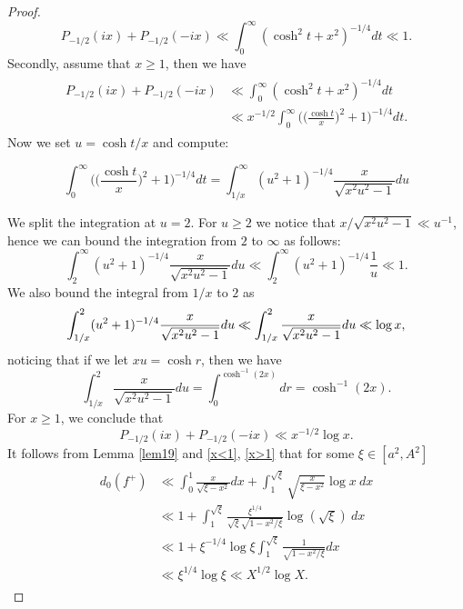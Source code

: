 \documentclass[a4paper,11pt]{amsart}
\theoremstyle{definition}
\begin{document}
\begin{proof}
\begin{equation}\label{x<1}P_{-1/2}(ix)+P_{-1/2}(-ix) \ll \int_0^{\infty}(\cosh^2t+x^2)^{-1/4}dt\ll 1.
\end{equation}
Secondly, assume that $x\ge 1$, then we have
\begin{align}
        \begin{split}
            P_{-1/2}(ix)+P_{-1/2}(-ix) &\ll \int_0^{\infty}(\cosh^2t+x^2)^{-1/4}dt \\
            & \ll x^{-1/2}\int_0^{\infty}\Big(\Big(\frac{\cosh t}{x}\Big)^2+1\Big)^{-1/4}dt.
        \end{split}
\end{align}
Now we set $u=\cosh t\big/x$ and compute:

          $$  \int_0^{\infty}\Big(\Big(\frac{\cosh t}{x}\Big)^2+1\Big)^{-1/4}dt = \int_{1/x}^{\infty}(u^2+1)^{-1/4}\frac{x}{\sqrt{x^2u^2-1}}du $$
         
We split the integration at $u=2$. For 
 $u\ge 2$ we notice that 
    $x\big/\sqrt{x^2u^2-1} \ll u^{-1}$,
    hence we can bound the integration from $2$ to $\infty$ as follows: 
    $$\int_{2}^{\infty}(u^2+1)^{-1/4}\frac{x}{\sqrt{x^2u^2-1}}du \ll \int_{2}^{\infty}(u^2+1)^{-1/4}\frac{1}{u}\ll 1.$$
    We also bound the integral from $1/x$ to $2$ as
    \begin{align}\notag
        \begin{split}
            \int_{1/x}^{2}(u^2+1)^{-1/4}\frac{x}{\sqrt{x^2u^2-1}}du \ll \int_{1/x}^2\frac{x}{\sqrt{x^2u^2-1}}du \ll \log x,
        \end{split}
    \end{align}
    noticing that if we let $xu=\cosh r$, then we have 
    $$\int_{1/x}^2\frac{x}{\sqrt{x^2u^2-1}}du =\int_{0}^{\cosh^{-1}(2x)} dr = \cosh^{-1}(2x).$$
    For $x\ge 1$, we conclude that 
    \begin{equation}\label{x>1}
         P_{-1/2}(ix)+P_{-1/2}(-ix) \ll x^{-1/2}\log x.
    \end{equation}
    It follows from Lemma \ref{lem19} and \eqref{x<1}, \eqref{x>1} that for some $\xi \in [a^2,A^2]$
\begin{align}
        \begin{split}
            d_0(f^{+}) &\ll 
             \int_0^{1}\frac{x}{\sqrt{\xi-x^2}}dx + \int_1^{\sqrt{\xi}}\sqrt{\frac{x}{\xi-x^2}}\log x\:dx \\
            &\ll 1+\int_1^{\sqrt{\xi}}\frac{\xi^{1/4}}{\sqrt{\xi}\sqrt{1-x^2/\xi}}\log( \sqrt{\xi})\:dx \\
             &\ll 1+\xi^{-1/4}\log \xi \int_1^{\sqrt{\xi}}\frac{1}{\sqrt{1-x^2/\xi}}dx \\
            &\ll \xi^{1/4}\log \xi \ll X^{1/2}\log X.
        \end{split}
    \end{align}
\end{proof}
 
\end{document}
